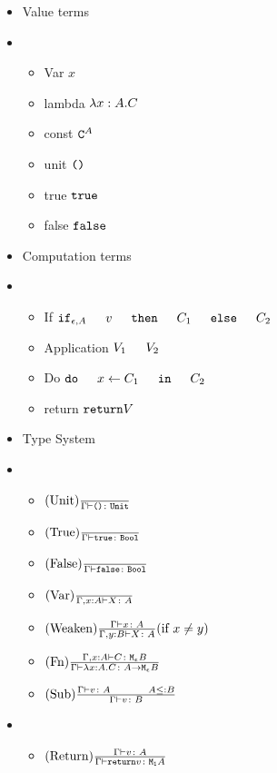 \documentclass{report}
\begin{document}
    \begin{itemize}
        \item Value terms
        \item \begin{itemize}
            \item Var $x$
            
            \item lambda $\lambda x : A. C$
            \item const $\texttt{C}^{A}$
            \item unit $\texttt{()}$
            \item true $\texttt{true}$
            \item false $\texttt{false}$
        \end{itemize}
        \item Computation terms
        \item  \begin{itemize}
            \item If $\ifthenelse{\e}{A}{v}{C_1}{C_2}$
            \item Application $\apply{V_1}{V_2}$
            \item Do $\doin{x}{C_1}{C_2}$
            \item return $\texttt{return} V$
        \end{itemize}
        \item Type System
        \item \begin{itemize}
            \item $(\text{Unit}) \frac{}{\Gamma \vdash \texttt{()} \colon \texttt{Unit}}$
            \item $(\text{True}) \frac{}{\Gamma \vdash \texttt{true} \colon \texttt{Bool}}$
            \item $(\text{False}) \frac{}{\Gamma \vdash \texttt{false} \colon \texttt{Bool}}$
            \item $(\text{Var}) \frac{}{\Gamma, x: A \vdash X \colon A}$
            \item $(\text{Weaken}) \frac{\Gamma \vdash x \colon A}{\Gamma, y: B \vdash X \colon A}(\text{if } x \neq y)$
            \item $(\text{Fn}) \frac{\Gamma, x: A \vdash C \colon \texttt{M}_{\epsilon}{B}}{\Gamma \vdash \lambda x : A. C \colon A \rightarrow \texttt{M}_{\epsilon}{B}}$
            \item $\treerule{Sub}{\typerelation{\G}{v}{A}\s\s A \subtype B}{\typerelation{\G}{v}{B}}$
        \end{itemize}
        \item \begin{itemize}
            \item $(\text{Return}) \frac{\Gamma \vdash v \colon A}{\Gamma \vdash \texttt{return} v \colon \texttt{M}_{\texttt{1}}{A}}$

\end{itemize}
\end{itemize}
\end{document}
